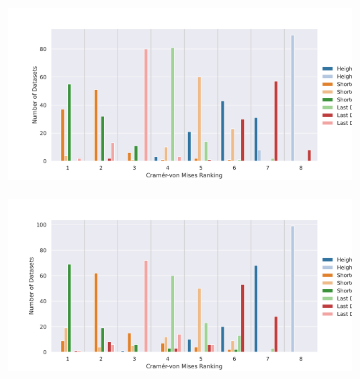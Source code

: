\documentclass[10pt,letterpaper]{article}
\begin{document}
\begin{figure}[h!]
	\caption{This figure shows how often a specific method ranks at a certain position when its Cramér-von Mises criterion is compared to the other methods. For example, the height ratio embedding with the beta distribution ranked first for almost all datasets. (The lower the rank the better.)}
	
	\centering
	\begin{subfigure}[b]{0.45\textwidth}
		\centering
		\includegraphics[width=\textwidth]{figures/yule-100-ccd1-cvm-ranking.png}
	\end{subfigure}
	\begin{subfigure}[b]{0.45\textwidth}
		\centering
		\includegraphics[width=\textwidth]{figures/yule-200-ccd1-cvm-ranking.png}
	\end{subfigure}
	

\end{figure}
\end{document}
